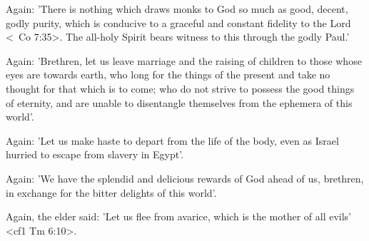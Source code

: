 Again: 'There is nothing which draws monks to God so much
as good, decent, godly purity, which is conducive to a graceful and
constant fidelity to the Lord <\ Co 7:35>. The all-holy Spirit bears
witness to this through the godly Paul.'

Again: 'Brethren, let us leave marriage and the raising of
children to those whose eyes are towards earth, who long for the
things of the present and take no thought for that which is to come;
who do not strive to possess the good things of eternity, and are
unable to disentangle themselves from the ephemera of this world'.

Again: 'Let us make haste to depart from the life of the body,
even as Israel hurried to escape from slavery in Egypt'.

Again: 'We have the splendid and delicious rewards of God
ahead of us, brethren, in exchange for the bitter delights of this
world'.

Again, the elder said: 'Let us flee from avarice, which is the
mother of all evils' <cf1 Tm 6:10>.

